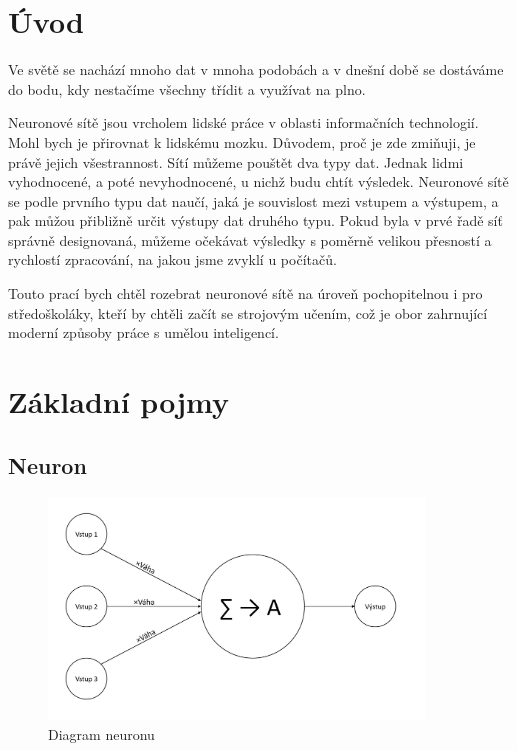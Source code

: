 \documentclass[12pt,a4paper]{report}
\begin{document}


\tableofcontents

\chapter{Úvod}
Ve světě se nachází mnoho dat v mnoha podobách a v dnešní době se dostáváme do 
bodu, kdy nestačíme všechny třídit a využívat na plno.

Neuronové sítě jsou vrcholem lidské práce v oblasti informačních technologií.
Mohl bych je přirovnat k lidskému mozku. Důvodem, proč je zde zmiňuji, je právě 
jejich všestrannost. Sítí můžeme pouštět dva typy dat. Jednak lidmi vyhodnocené,
a poté nevyhodnocené, u nichž budu chtít výsledek. Neuronové sítě se podle prvního typu dat naučí, jaká je souvislost mezi vstupem a výstupem, a pak můžou přibližně určit výstupy dat druhého typu. Pokud byla v prvé řadě síť správně designovaná, můžeme očekávat výsledky s poměrně velikou přesností a rychlostí zpracování, na jakou jsme zvyklí u počítačů.

Touto prací bych chtěl rozebrat neuronové sítě na úroveň pochopitelnou i pro středoškoláky, kteří by chtěli začít se strojovým učením, což je obor zahrnující moderní způsoby práce s umělou inteligencí.

\chapter{Základní pojmy} %

\section{Neuron}
	\begin{figure}[h]
		\centering
		\includegraphics[width=10cm]{images/neuron}
		\caption{Diagram neuronu}
	\end{figure}
\end{document}
